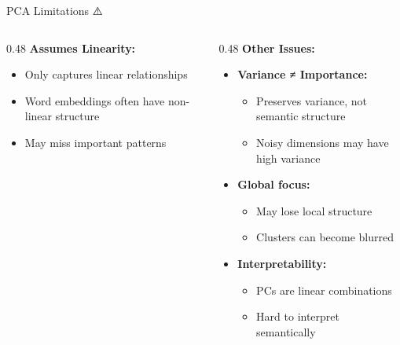 \documentclass[aspectratio=169]{beamer}
\begin{document}
\begin{frame}[shrink=10]{PCA Limitations ⚠️}
\begin{columns}[T]
\begin{column}{0.48\textwidth}
\textbf{Assumes Linearity:}
\begin{itemize}\setlength{\itemsep}{0pt}
    \item Only captures linear relationships
    \item Word embeddings often have non-linear structure
    \item May miss important patterns
\end{itemize}

\vspace{0.5em}
\begin{center}
\end{center}
\end{column}

\begin{column}{0.48\textwidth}
\textbf{Other Issues:}
\begin{itemize}\setlength{\itemsep}{0pt}
    \item \textbf{Variance ≠ Importance:}
    \begin{itemize}\setlength{\itemsep}{0pt}
        \item Preserves variance, not semantic structure
        \item Noisy dimensions may have high variance
    \end{itemize}

    \item \textbf{Global focus:}
    \begin{itemize}\setlength{\itemsep}{0pt}
        \item May lose local structure
        \item Clusters can become blurred
    \end{itemize}

    \item \textbf{Interpretability:}
    \begin{itemize}\setlength{\itemsep}{0pt}
        \item PCs are linear combinations
        \item Hard to interpret semantically
    \end{itemize}
\end{itemize}


\end{column}
\end{columns}
\end{frame}
\end{document}
